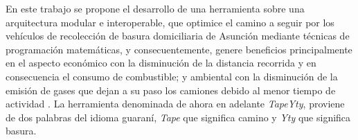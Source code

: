 \documentclass[conference]{IEEEtran}
\begin{document}
En este trabajo se propone el desarrollo de una herramienta sobre una arquitectura modular e interoperable, que optimice el camino a seguir por los vehículos de recolección de basura domiciliaria de Asunción mediante técnicas de programación matemáticas, y consecuentemente, genere beneficios principalmente en el aspecto económico con la disminución de la distancia recorrida y en consecuencia el consumo de combustible; y ambiental con la disminución de la emisión de gases que dejan a su paso los camiones debido al menor tiempo de actividad \cite{Vu2018ParameterModel}. La herramienta denominada de ahora en adelante \textit{TapeYty}, proviene de dos palabras del idioma guaraní, \textit{Tape} que significa camino y \textit{Yty} que significa basura.
\end{document}
